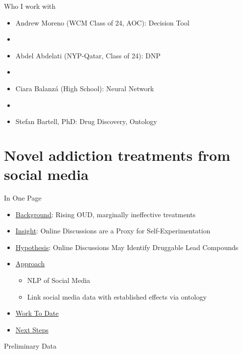 \begin{frame}{Who I work with}
\addtolength{\leftmargini}{\labelsep}
\begin{itemize}
	\item[] Andrew Moreno (WCM Class of 24, AOC): Decision Tool
	\item[]
	\item[] Abdel Abdelati (NYP-Qatar, Class of 24): DNP
	\item[] 
	\item[] Ciara Balanz\'{a} (High School): Neural Network
	\item[] 
	\item[] Stefan Bartell, PhD: Drug Discovery, Ontology
\end{itemize}

\end{frame}

\section[Drug Discovery]{Novel addiction treatments from social media}

\begin{frame}{In One Page}
\addtolength{\leftmargini}{\labelsep}
\begin{itemize}
	\item[] \uline{Background}: Rising OUD, marginally ineffective treatments
	\item[] \uline{Insight}: Online Discussions are a Proxy for Self-Experimentation
	\item[] \uline{Hypothesis}: Online Discussions May Identify Druggable Lead Compounds
	\item[] \uline{Approach}
	\begin{itemize}
		\item[] NLP of Social Media
		\item[] Link social media data with established effects via ontology
	\end{itemize} 
	\item[] \uline{Work To Date}
	\item[] \uline{Next Steps}
\end{itemize}
\end{frame}

\begin{frame}{Preliminary Data}

\end{frame}

